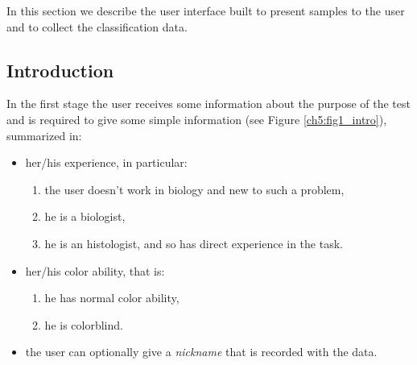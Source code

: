 In this section we describe the user interface built to present samples to the user and to collect the classification data.

\vspace{0.5cm}

\subsection{Introduction}

In the first stage the user receives some information about the purpose of the test and is required to give some simple information (see Figure \ref{ch5:fig1_intro}), summarized in:

\begin{itemize}
 \item her/his experience, in particular:
 \begin{enumerate}
  \item the user doesn't work in biology and new to such a problem,
  \item he is a biologist,
  \item he is an histologist, and so has direct experience in the task.
 \end{enumerate}
 \item her/his color ability, that is:
  \begin{enumerate}
   \item he has normal color ability,
   \item he is colorblind.
  \end{enumerate}
 \item the user can optionally give a \textit{nickname} that is recorded with the data.
\end{itemize}

\noindent

